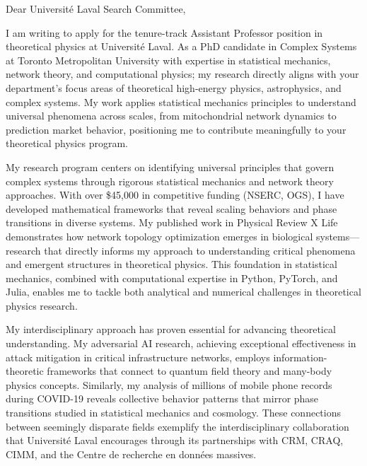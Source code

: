 Dear Université Laval Search Committee,
\vspace{1.0em}

\hspace{1.5em} I am writing to apply for the tenure-track Assistant Professor position in theoretical physics at Université Laval. As a PhD candidate in Complex Systems at Toronto Metropolitan University with expertise in statistical mechanics, network theory, and computational physics; my research directly aligns with your department's focus areas of theoretical high-energy physics, astrophysics, and complex systems. My work applies statistical mechanics principles to understand universal phenomena across scales, from mitochondrial network dynamics to prediction market behavior, positioning me to contribute meaningfully to your theoretical physics program.
\vspace{1.0em}

\hspace{1.5em} My research program centers on identifying universal principles that govern complex systems through rigorous statistical mechanics and network theory approaches. With over \$45,000 in competitive funding (NSERC, OGS), I have developed mathematical frameworks that reveal scaling behaviors and phase transitions in diverse systems. My published work in Physical Review X Life demonstrates how network topology optimization emerges in biological systems—research that directly informs my approach to understanding critical phenomena and emergent structures in theoretical physics. This foundation in statistical mechanics, combined with computational expertise in Python, PyTorch, and Julia, enables me to tackle both analytical and numerical challenges in theoretical physics research.
\vspace{1.0em}

\hspace{1.5em} My interdisciplinary approach has proven essential for advancing theoretical understanding. My adversarial AI research, achieving exceptional effectiveness in attack mitigation in critical infrastructure networks, employs information-theoretic frameworks that connect to quantum field theory and many-body physics concepts. Similarly, my analysis of millions of mobile phone records during COVID-19 reveals collective behavior patterns that mirror phase transitions studied in statistical mechanics and cosmology. These connections between seemingly disparate fields exemplify the interdisciplinary collaboration that Université Laval encourages through its partnerships with CRM, CRAQ, CIMM, and the Centre de recherche en données massives.
\vspace{1.0em}

